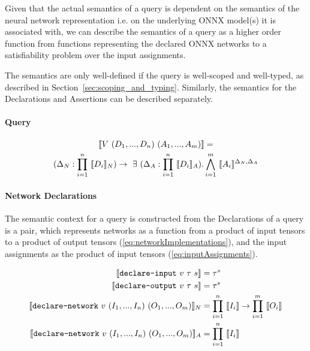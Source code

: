 Given that the actual semantics of a \vnnlib{} query is dependent on the semantics of the neural network representation i.e. on the underlying ONNX model(s) it is associated with, we can describe the semantics of a query as a higher order function from functions representing the declared ONNX networks to a satisfiability problem over the input assignments. 

The semantics are only well-defined if the query is well-scoped and well-typed, as described in Section~\ref{sec:scoping_and_typing}. Similarly, the semantics for the Declarations and Assertions can be described separately.



\paragraph{Query}
\begin{multline}
\llbracket V~(D_1,...,D_n)~(A_1,...,A_m) \rrbracket = \\
    (\Delta_N : \prod^{n}_{i=1}~\llbracket D_i \rrbracket_N) \rightarrow~\exists~(\Delta_A : \prod^{n}_{i=1}~\llbracket D_i \rrbracket_A).\bigwedge^{m}_{i=1}~\llbracket A_i \rrbracket^{\Delta_N,\Delta_A} \\
\end{multline}

\paragraph{Network Declarations}
The semantic context for a \vnnlib{} query is constructed from the Declarations of a \vnnlib{} query is a pair, which represents networks as a function from a product of input tensors to a product of output tensors (\autoref{eq:networkImplementations}), and the input assignments as the product of input tensors (\autoref{eq:inputAssignments}).

\begin{align}
    \llbracket \texttt{declare-input}~v~\tau~s \rrbracket &= \tau^s \label{eq:declInput}\\
    \llbracket \texttt{declare-output}~v~\tau~s \rrbracket &= \tau^s \label{eq:declOutput}\\
    \llbracket \texttt{declare-network}~v~(I_1,...,I_n)~(O_1,...,O_m) \rrbracket_N &= \prod^{n}_{i=1}~\llbracket I_i \rrbracket \rightarrow \prod^{m}_{i=1}~\llbracket O_i \rrbracket \label{eq:networkImplementations} \\
    \llbracket \texttt{declare-network}~v~(I_1,...,I_n)~(O_1,...,O_m) \rrbracket_A &= \prod^{n}_{i=1}~\llbracket I_i \rrbracket \label{eq:inputAssignments}
\end{align}

